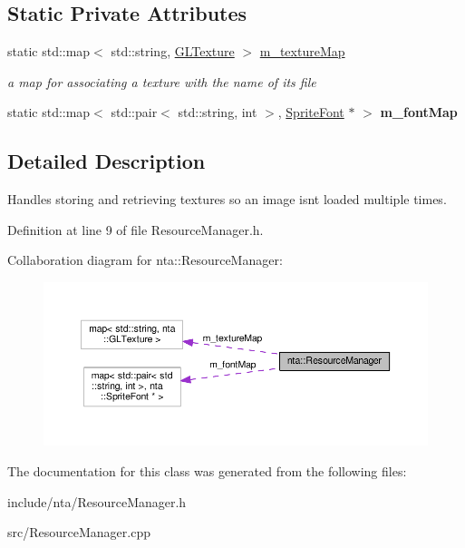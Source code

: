 \subsection*{Static Private Attributes}
\begin{DoxyCompactItemize}
\item 
\mbox{\label{classnta_1_1ResourceManager_abf9bb10402834f05b2673e0c1d8cb9aa}} 
static std\+::map$<$ std\+::string, \hyperlink{namespacenta_d3/dff/structnta_1_1GLTexture}{G\+L\+Texture} $>$ \hyperlink{classnta_1_1ResourceManager_abf9bb10402834f05b2673e0c1d8cb9aa}{m\+\_\+texture\+Map}
\begin{DoxyCompactList}\small\item\em a map for associating a texture with the name of its file \end{DoxyCompactList}\item 
\mbox{\label{classnta_1_1ResourceManager_ac6a87b69211ba52452b4c02847ea934e}} 
static std\+::map$<$ std\+::pair$<$ std\+::string, int $>$, \hyperlink{classnta_1_1SpriteFont}{Sprite\+Font} $\ast$ $>$ {\bfseries m\+\_\+font\+Map}
\end{DoxyCompactItemize}


\subsection{Detailed Description}
Handles storing and retrieving textures so an image isn\textquotesingle{}t loaded multiple times. 

Definition at line 9 of file Resource\+Manager.\+h.



Collaboration diagram for nta\+:\+:Resource\+Manager\+:\nopagebreak
\begin{figure}[H]
\begin{center}
\leavevmode
\includegraphics[width=350pt]{d2/d39/classnta_1_1ResourceManager__coll__graph}
\end{center}
\end{figure}


The documentation for this class was generated from the following files\+:\begin{DoxyCompactItemize}
\item 
include/nta/Resource\+Manager.\+h\item 
src/Resource\+Manager.\+cpp\end{DoxyCompactItemize}

